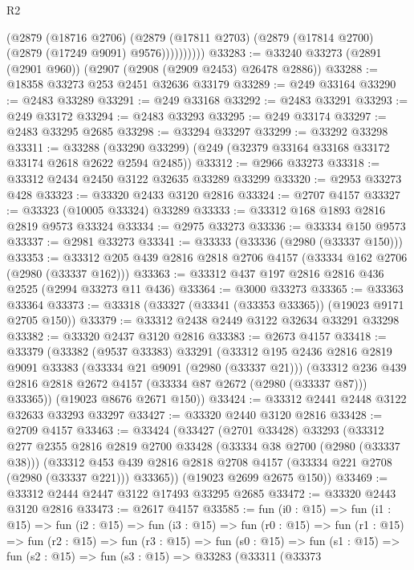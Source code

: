 \begin{lexlean}{R2}
\begin{coremodule}
                (@2879
                  (@18716 @2706)
                  (@2879 (@17811 @2703) (@2879 (@17814 @2700) (@2879 (@17249 @9091) @9576))))))))))
@33283 := @33240 @33273 (@2891 (@2901 @960)) (@2907 (@2908 (@2909 @2453) @26478 @2886))
@33288 := @18358 @33273 @253 @2451 @32636 @33179
@33289 := @249 @33164
@33290 := @2483 @33289
@33291 := @249 @33168
@33292 := @2483 @33291
@33293 := @249 @33172
@33294 := @2483 @33293
@33295 := @249 @33174
@33297 := @2483 @33295 @2685
@33298 := @33294 @33297
@33299 := @33292 @33298
@33311 := @33288 (@33290 @33299) (@249 (@32379 @33164 @33168 @33172 @33174 @2618 @2622 @2594 @2485))
@33312 := @2966 @33273
@33318 := @33312 @2434 @2450 @3122 @32635 @33289 @33299
@33320 := @2953 @33273 @428
@33323 := @33320 @2433 @3120 @2816
@33324 := @2707 @4157
@33327 := @33323 (@10005 @33324) @33289
@33333 := @33312 @168 @1893 @2816 @2819 @9573 @33324
@33334 := @2975 @33273
@33336 := @33334 @150 @9573
@33337 := @2981 @33273
@33341 := @33333 (@33336 (@2980 (@33337 @150)))
@33353 := @33312 @205 @439 @2816 @2818 @2706 @4157 (@33334 @162 @2706 (@2980 (@33337 @162)))
@33363 := @33312 @437 @197 @2816 @2816 @436 @2525 (@2994 @33273 @11 @436)
@33364 := @3000 @33273
@33365 := @33363 @33364
@33373 := @33318 (@33327 (@33341 (@33353 @33365)) (@19023 @9171 @2705 @150))
@33379 := @33312 @2438 @2449 @3122 @32634 @33291 @33298
@33382 := @33320 @2437 @3120 @2816
@33383 := @2673 @4157
@33418 := @33379
    (@33382
      (@9537 @33383)
      @33291
      (@33312
        @195
        @2436
        @2816
        @2819
        @9091
        @33383
        (@33334 @21 @9091 (@2980 (@33337 @21)))
        (@33312 @236 @439 @2816 @2818 @2672 @4157 (@33334 @87 @2672 (@2980 (@33337 @87))) @33365))
      (@19023 @8676 @2671 @150))
@33424 := @33312 @2441 @2448 @3122 @32633 @33293 @33297
@33427 := @33320 @2440 @3120 @2816
@33428 := @2709 @4157
@33463 := @33424
    (@33427
      (@2701 @33428)
      @33293
      (@33312
        @277
        @2355
        @2816
        @2819
        @2700
        @33428
        (@33334 @38 @2700 (@2980 (@33337 @38)))
        (@33312 @453 @439 @2816 @2818 @2708 @4157 (@33334 @221 @2708 (@2980 (@33337 @221))) @33365))
      (@19023 @2699 @2675 @150))
@33469 := @33312 @2444 @2447 @3122 @17493 @33295 @2685
@33472 := @33320 @2443 @3120 @2816
@33473 := @2617 @4157
@33585 := fun (i0 : @15) =>
  fun (i1 : @15) =>
  fun (i2 : @15) =>
  fun (i3 : @15) =>
  fun (r0 : @15) =>
  fun (r1 : @15) =>
  fun (r2 : @15) =>
  fun (r3 : @15) =>
  fun (s0 : @15) =>
  fun (s1 : @15) =>
  fun (s2 : @15) =>
  fun (s3 : @15) =>
  @33283
    (@33311
      (@33373

\end{coremodule}
\end{lexlean}
